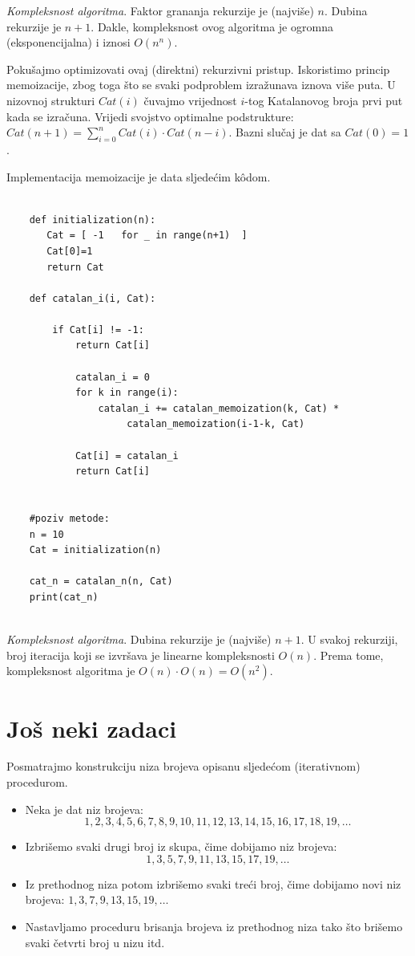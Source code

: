   \emph{Kompleksnost algoritma}. Faktor grananja rekurzije je (najviše) $n$. Dubina rekurzije je $n+1$. Dakle, kompleksnost ovog algoritma je ogromna (eksponencijalna) i iznosi $O(n^n)$. 

Pokušajmo optimizovati ovaj (direktni) rekurzivni pristup. Iskoristimo princip memoizacije, zbog toga što se svaki podproblem izražunava iznova više puta. U nizovnoj strukturi $Cat(i)$ čuvajmo vrijednost $i$-tog Katalanovog broja prvi put kada se izračuna.  Vrijedi svojstvo optimalne podstrukture: $Cat(n+1) = \sum_{i=0}^{n} Cat(i) \cdot Cat(n-i).$ Bazni slučaj je dat sa $Cat(0) =1$.

Implementacija memoizacije je data sljedećim k\^odom.

  \begin{verbatim}
	
	def initialization(n):
	   Cat = [ -1   for _ in range(n+1)  ] 
	   Cat[0]=1
	   return Cat 
	
	def catalan_i(i, Cat): 
	
	    if Cat[i] != -1:
	        return Cat[i]
     
            catalan_i = 0
            for k in range(i): 
                catalan_i += catalan_memoization(k, Cat) *
                     catalan_memoization(i-1-k, Cat)
    
            Cat[i] = catalan_i
            return Cat[i]
    
	   
	#poziv metode:
	n = 10
	Cat = initialization(n) 
	
	cat_n = catalan_n(n, Cat) 
	print(cat_n)
	
\end{verbatim}  

\emph{Kompleksnost algoritma}. Dubina rekurzije je (najviše) $n+1$. U svakoj rekurziji, broj iteracija koji se izvršava je linearne kompleksnosti $O(n)$. Prema tome, kompleksnost algoritma je $O(n) \cdot O(n) = O(n^2)$. 



 
 \section{Još neki zadaci}
 
 Posmatrajmo konstrukciju niza brojeva opisanu sljedećom (iterativnom) procedurom.
 
 \begin{itemize}
 	\item Neka je dat niz brojeva:
 	$$1, 2, 3, 4, 5, 6, 7, 8, 9, 10, 11, 12, 13, 14, 15, 16, 17, 18, 19,\ldots $$
 	\item Izbrišemo svaki drugi broj iz skupa, čime dobijamo niz brojeva:
 	$$1, 3, 5, 7, 9, 11, 13, 15, 17, 19,\ldots$$
 	\item Iz prethodnog niza potom izbrišemo svaki treći broj, čime dobijamo novi niz brojeva: $1, 3, 7, 9, 13, 15, 19,\ldots$
 	\item Nastavljamo proceduru brisanja brojeva iz prethodnog niza tako što brišemo svaki četvrti broj u nizu itd.
 \end{itemize} 
 
